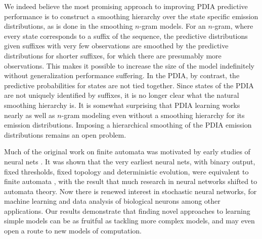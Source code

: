We indeed believe the most promising approach to improving PDIA predictive performance is to construct a smoothing hierarchy over the state specific emission distributions, as is done in the smoothing $n$-gram models.  For an $n$-gram, where every state corresponds to a suffix of the sequence, the predictive distributions given suffixes with very few observations are smoothed by the predictive distributions for shorter suffixes, for which there are presumably more observations.  This makes it possible to increase the size of the model indefinitely without generalization performance suffering.  In the PDIA, by contrast, the predictive probabilities for states are not tied together.  Since states of the PDIA are not uniquely identified by suffixes, it is no longer clear what the natural smoothing hierarchy is.  It is somewhat surprising that PDIA learning works nearly as well as $n$-gram modeling even without a smoothing hierarchy for its emission distributions.  Imposing a hierarchical smoothing of the PDIA emission distributions remains an open problem. 


Much of the original work on finite automata was motivated by early studies of neural nets \cite{Hopcroft1979}. It was shown that the very earliest neural nets, with binary output, fixed thresholds, fixed topology and deterministic evolution, were equivalent to finite automata \cite{Kleene1956}, with the result that much research in neural networks shifted to automata theory.  Now there is renewed interest in stochastic neural networks, for machine learning \cite{Hinton2006} and data analysis of biological neurons \cite{Pillow2008} among other applications.  Our results demonstrate that finding novel approaches to learning simple models can be as fruitful as tackling more complex models, and may even open a route to new models of computation.